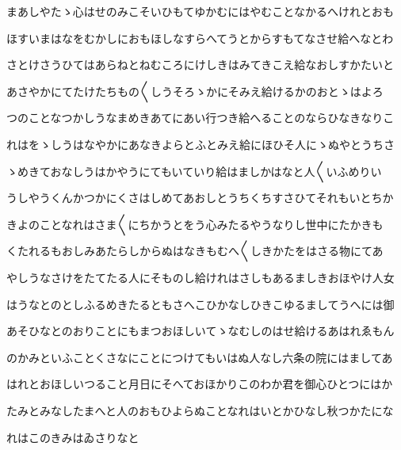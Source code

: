 \documentclass[a4paper,11pt,landscape]{ltjtarticle}
\begin{document}
\par\medskip
まあしやたゝ心はせのみこそいひもてゆかむにはやむことなかるへけれとおも
\par\medskip
ほすいまはなをむかしにおもほしなすらへてうとからすもてなさせ給へなとわ
\par\medskip
さとけさうひてはあらねとねむころにけしきはみてきこえ給なおしすかたいと
\par\medskip
あさやかにてたけたちもの〱しうそろゝかにそみえ給けるかのおとゝはよろ
\par\medskip
つのことなつかしうなまめきあてにあい行つき給へることのならひなきなりこ
\par\medskip
れはをゝしうはなやかにあなきよらとふとみえ給にほひそ人にゝぬやとうちさ
\par\medskip
ゝめきておなしうはかやうにてもいていり給はましかはなと人〱いふめりい
\par\medskip
うしやうくんかつかにくさはしめてあおしとうちくちすさひてそれもいとちか
\par\medskip
きよのことなれはさま〱にちかうとをう心みたるやうなりし世中にたかきも
\par\medskip
くたれるもおしみあたらしからぬはなきもむへ〱しきかたをはさる物にてあ
\par\medskip
やしうなさけをたてたる人にそものし給けれはさしもあるましきおほやけ人女
\par\medskip
はうなとのとしふるめきたるともさへこひかなしひきこゆるましてうへには御
\par\medskip
あそひなとのおりことにもまつおほしいてゝなむしのはせ給けるあはれゑもん
\par\medskip
のかみといふことくさなにことにつけてもいはぬ人なし六条の院にはましてあ
\par\medskip
はれとおほしいつること月日にそへておほかりこのわか君を御心ひとつにはか
\par\medskip
たみとみなしたまへと人のおもひよらぬことなれはいとかひなし秋つかたにな
\par\medskip
れはこのきみはゐさりなと
\par\medskip
\end{document}
